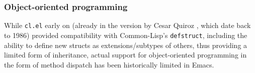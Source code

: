 \documentclass[format=acmsmall, review=false, screen=true]{acmart}
\begin{document}

\subsubsection{Object-oriented programming} %

While \texttt{cl.el} early on (already in the version by Cesar Quiroz
, which date back to 1986) provided
compatibility with Common-Lisp's \texttt{defstruct}, including the ability
to define new structs as extensions/subtypes of others, thus providing
a limited form of inheritance, actual support for object-oriented
programming in the form of method dispatch has been historically limited
in Emacs.
\end{document}
